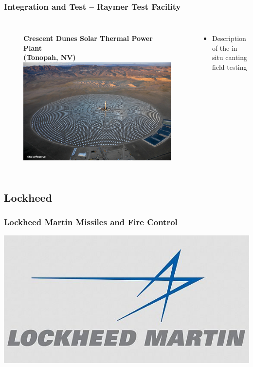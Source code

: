 \documentclass[aspectratio=169]{beamer}
\begin{document}
\begin{frame}
  \frametitle{Integration and Test -- Raymer Test Facility}
  \begin{columns}[c]
    \begin{figure}
      \textbf{Crescent Dunes Solar Thermal Power Plant\\
        (Tonopah, NV)}
      \includegraphics[width=\linewidth]{CDSEP.jpg}
    \end{figure}

    \begin{itemize}
    \item Description of the in-situ canting field testing
    \end{itemize}
  \end{columns}
\end{frame}

\subsection{Lockheed}
\begin{frame}
  \frametitle{Lockheed Martin Missiles and Fire Control}
  \center
  \includegraphics[width=.7\linewidth]{LockheedLogo}
\end{frame}
\end{document}
